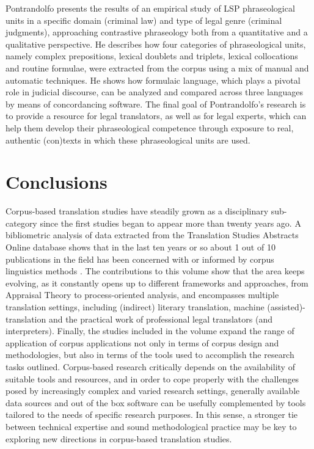 \documentclass[output=paper]{LSP/langsci}
\begin{document}
Pontrandolfo presents the results of an empirical study of LSP phraseological units in a specific domain (criminal law) and type of legal genre (criminal judgments), approaching contrastive phraseology both from a quantitative and a qualitative perspective. He describes how four categories of phraseological units, namely complex prepositions, lexical doublets and triplets, lexical collocations and routine formulae, were extracted from the corpus using a mix of manual and automatic techniques. He shows how formulaic language, which plays a pivotal role in judicial discourse, can be analyzed and compared across three languages by means of concordancing software. The final goal of Pontrandolfo’s research is to provide a resource for legal translators, as well as for legal experts, which can help them develop their phraseological competence through exposure to real, authentic (con)texts in which these phraseological units are used.

\section{Conclusions}
Corpus-based translation studies have steadily grown as a disciplinary sub-category since the first studies began to appear more than twenty years ago. A bibliometric analysis of data extracted from the Translation Studies Abstracts Online database shows that in the last ten years or so about 1 out of 10 publications in the field has been concerned with or informed by corpus linguistics methods \citep{Zanettin2015}. The contributions to this volume show that the area keeps evolving, as it constantly opens up to different frameworks and approaches, from Appraisal Theory to process-oriented analysis, and encompasses multiple translation settings, including (indirect) literary translation, machine (assisted)-translation and the practical work of professional legal translators (and interpreters). Finally, the studies included in the volume expand the range of application of corpus applications not only in terms of corpus design and methodologies, but also in terms of the tools used to accomplish the research tasks outlined. Corpus-based research critically depends on the availability of suitable tools and resources, and in order to cope properly with the challenges posed by increasingly complex and varied research settings, generally available data sources and out of the box software can be usefully complemented by tools tailored to the needs of specific research purposes. In this sense, a stronger tie between technical expertise and sound methodological practice may be key to exploring new directions in corpus-based translation studies.

\printbibliography[heading=subbibliography,notkeyword=this]
\end{document}
